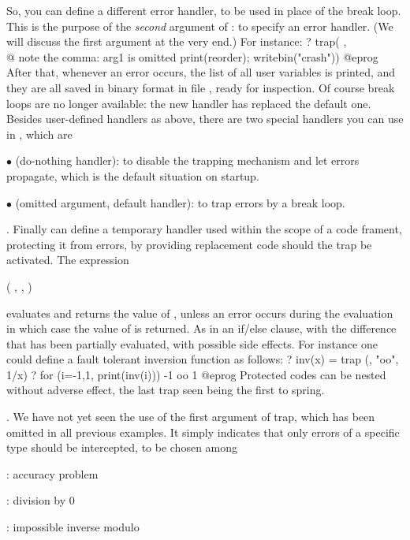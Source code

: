 So, you can define a different error handler, to be used in place of the
break loop. This is the purpose of the \emph{second} argument of :
to specify an error handler. (We will discuss the first argument at the very
end.) For instance:
\bprog
? { trap( ,                \\@ note the comma: arg1 is omitted
      print(reorder);
      writebin("crash")) }
@eprog
\noindent After that, whenever an error occurs, the list of all user
variables is printed, and they are all saved in binary format in file
, ready for inspection. Of course break loops are no longer
available: the new handler has replaced the default one. Besides user-defined
handlers as above, there are two special handlers you can use in ,
which are

$\bullet$  (do-nothing handler): to disable the trapping
mechanism and let errors propagate, which is the default situation on
startup.

$\bullet$   (omitted argument, default handler): to trap errors
by a break loop.

. Finally  can define a temporary handler
used within the scope of a code frament, protecting it from errors, by
providing replacement code should the trap be activated. The expression

  ( , , )

\noindent evaluates and returns the value of , unless an
error occurs during the evaluation in which case the value of 
is returned. As in an if/else clause, with the difference that
 has been partially evaluated, with possible side effects.
For instance one could define a fault tolerant inversion function as follows:
\bprog
? inv(x) = trap (, "oo", 1/x)
? for (i=-1,1, print(inv(i)))
-1
oo
1
@eprog
\noindent Protected codes can be nested without adverse effect, the last trap
seen being the first to spring.

. We have not yet seen the use of the
first argument of trap, which has been omitted in all previous examples. It
simply indicates that only errors of a specific type should be intercepted,
to be chosen among

: accuracy problem

: division by 0

: impossible inverse modulo

